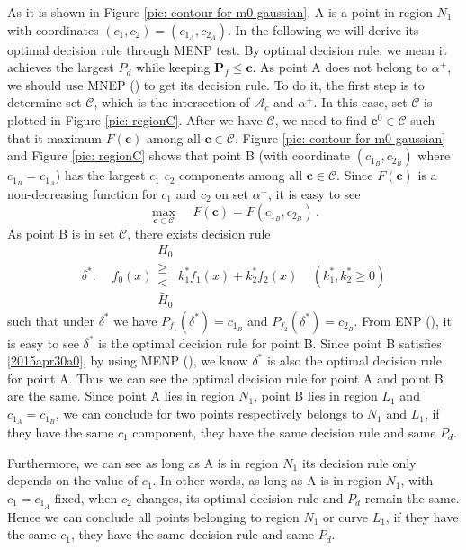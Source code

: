 As it is shown in Figure \ref{pic: contour for m0 gaussian}, A is a point in region ${N}_1$ with coordinates $(c_1, c_2) = (c_{1_A}, c_{2_A})$. In the following we will derive its optimal decision rule through MENP test. By optimal decision rule, we mean   it achieves the largest $P_d$ while keeping $\mathbf{P}_f \leq \mathbf{c}$.  
As point A does not belong to $\alpha^+$, we should use MNEP () to get its decision rule. To do it, the first step is to determine set $\mathcal{C}$, which is the intersection of $\mathcal{A}_c$ and $\alpha^+$. In this case, set $\mathcal{C}$ is plotted in Figure \ref{pic: regionC}.
After we have $\mathcal{C}$, we need to find $\mathbf{c}^0 \in \mathcal{C}$ such that it maximum $F(\mathbf{c})$ among all $\mathbf{c} \in \mathcal{C}$.
Figure \ref{pic: contour for m0 gaussian} and Figure \ref{pic: regionC} shows that point B (with coordinate $(c_{1_B}, c_{2_B})$ where $c_{1_B} = c_{1_A}$) has the largest $c_1$ $c_2$ components among all $\mathbf{c} \in \mathcal{C}$. Since $F(\mathbf{c})$ is a non-decreasing function for $c_1$ and $c_2$ on set $\alpha^+$, it is easy to see
\begin{equation}
  \max_{\mathbf{c} \in \mathcal{C}}\;\;\;\;F(\mathbf{c}) = F(c_{1_B}, c_{2_B})\,.
  \label{2015apr30a0}
\end{equation}
 As point B is in set $\mathcal{C}$, there exists decision rule
 \[
\delta^\ast:\;\;\;\;f_0(x) \substack{H_0 \\ \geq \\ < \\ \bar{H}_0} k_1^\ast f_1(x) + k_2^\ast f_2(x) \;\;\;\;(k_1^\ast, k_2^\ast \geq 0)
 \]
 such that under $\delta^\ast$ we have  $P_{f_1}(\delta^\ast) = c_{1_B}$ and  $P_{f_2}(\delta^\ast) = c_{2_B}$. 
 From ENP (), it is easy to see $\delta^\ast$ is the optimal decision rule for point B.
 Since point B satisfies \eqref{2015apr30a0}, by using MENP (), we know $\delta^\ast$ is also the optimal decision rule for point A. Thus we can see the optimal decision rule for point A and point B are the same. Since point A lies in region $N_1$, point B lies in region $L_1$ and $c_{1_A} = c_{1_B}$, we can conclude for two points respectively belongs to $N_1$ and $L_1$, if they have the same $c_1$ component, they have the same decision rule and same $P_d$. 

Furthermore, we can see as long as A is in region $N_1$ its decision rule only depends on the value of $c_{1}$.  In other words, as long as A is in region $N_1$, with $c_1 = c_{1_A}$ fixed,  when $c_{2}$ changes, its optimal decision rule and $P_d$ remain the same. Hence we can conclude all points belonging to region $N_1$ or curve $L_1$, if they have the same $c_1$, they have the same decision rule and same $P_d$.

